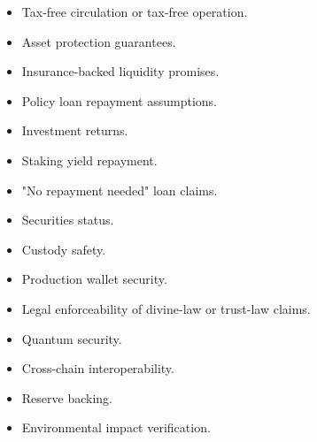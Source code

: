 ﻿\documentclass[12pt]{article}
\begin{document}
\begin{itemize}
  \item Tax-free circulation or tax-free operation.
\end{itemize}
\begin{itemize}
  \item Asset protection guarantees.
\end{itemize}
\begin{itemize}
  \item Insurance-backed liquidity promises.
\end{itemize}
\begin{itemize}
  \item Policy loan repayment assumptions.
\end{itemize}
\begin{itemize}
  \item Investment returns.
\end{itemize}
\begin{itemize}
  \item Staking yield repayment.
\end{itemize}
\begin{itemize}
  \item "No repayment needed" loan claims.
\end{itemize}
\begin{itemize}
  \item Securities status.
\end{itemize}
\begin{itemize}
  \item Custody safety.
\end{itemize}
\begin{itemize}
  \item Production wallet security.
\end{itemize}
\begin{itemize}
  \item Legal enforceability of divine-law or trust-law claims.
\end{itemize}
\begin{itemize}
  \item Quantum security.
\end{itemize}
\begin{itemize}
  \item Cross-chain interoperability.
\end{itemize}
\begin{itemize}
  \item Reserve backing.
\end{itemize}
\begin{itemize}
  \item Environmental impact verification.
\end{itemize}
\end{document}
